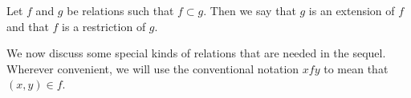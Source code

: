 Let $f$ and $g$ be relations such that $f \subset g$. Then we say that $g$ is an extension of $f$ and that $f$ is a restriction of $g$.

We now discuss some special kinds of relations that are needed in the sequel. Wherever convenient, we will use the conventional notation $xfy$ to mean that $(x, y) \in f$.